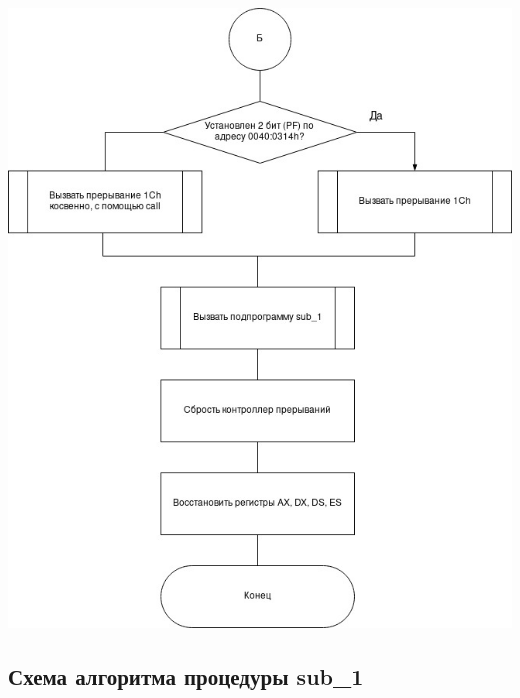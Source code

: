 \documentclass[a4paper,12pt]{article}
\begin{document}
\begin{flushright}
	\includegraphics[scale=0.76]{../src/int8h_3.jpg}
\end{flushright}

\clearpage
\subsection{Схема алгоритма процедуры sub\_1}
\end{document}

